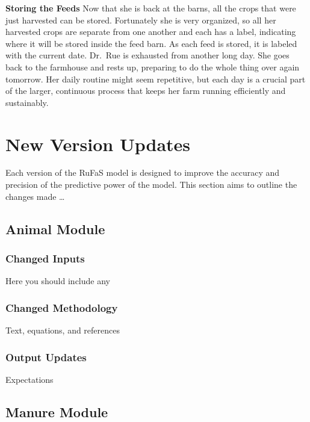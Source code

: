 \documentclass[
  letterpaper,
  oneside,
  openany]{scrbook}
\begin{document}
\textbf{Storing the Feeds} Now that she is back at the barns, all the
crops that were just harvested can be stored. Fortunately she is very
organized, so all her harvested crops are separate from one another and
each has a label, indicating where it will be stored inside the feed
barn. As each feed is stored, it is labeled with the current date.
Dr.~Rue is exhausted from another long day. She goes back to the
farmhouse and rests up, preparing to do the whole thing over again
tomorrow. Her daily routine might seem repetitive, but each day is a
crucial part of the larger, continuous process that keeps her farm
running efficiently and sustainably.


\chapter{New Version Updates}\label{new-version-updates}

Each version of the RuFaS model is designed to improve the accuracy and
precision of the predictive power of the model. This section aims to
outline the changes made \ldots{}

\section{Animal Module}\label{animal-module}

\subsection{Changed Inputs}\label{changed-inputs}

Here you should include any

\subsection{Changed Methodology}\label{changed-methodology}

Text, equations, and references

\subsection{Output Updates}\label{output-updates}

Expectations

\section{Manure Module}\label{manure-module}
\end{document}

